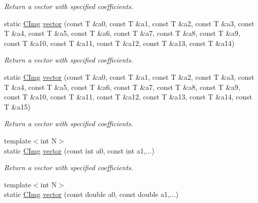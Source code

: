 \begin{DoxyCompactItemize}
\begin{DoxyCompactList}\small\item\em Return a vector with specified coefficients. \end{DoxyCompactList}\item 
\hypertarget{structcimg__library_1_1_c_img_a38eca269e613757819feccae04f5cd29}{static \hyperlink{structcimg__library_1_1_c_img}{C\-Img} \hyperlink{structcimg__library_1_1_c_img_a38eca269e613757819feccae04f5cd29}{vector} (const T \&a0, const T \&a1, const T \&a2, const T \&a3, const T \&a4, const T \&a5, const T \&a6, const T \&a7, const T \&a8, const T \&a9, const T \&a10, const T \&a11, const T \&a12, const T \&a13, const T \&a14)}\label{structcimg__library_1_1_c_img_a38eca269e613757819feccae04f5cd29}

\begin{DoxyCompactList}\small\item\em Return a vector with specified coefficients. \end{DoxyCompactList}\item 
\hypertarget{structcimg__library_1_1_c_img_afcce36993b98a8a1a49cdae3f946b614}{static \hyperlink{structcimg__library_1_1_c_img}{C\-Img} \hyperlink{structcimg__library_1_1_c_img_afcce36993b98a8a1a49cdae3f946b614}{vector} (const T \&a0, const T \&a1, const T \&a2, const T \&a3, const T \&a4, const T \&a5, const T \&a6, const T \&a7, const T \&a8, const T \&a9, const T \&a10, const T \&a11, const T \&a12, const T \&a13, const T \&a14, const T \&a15)}\label{structcimg__library_1_1_c_img_afcce36993b98a8a1a49cdae3f946b614}

\begin{DoxyCompactList}\small\item\em Return a vector with specified coefficients. \end{DoxyCompactList}\item 
\hypertarget{structcimg__library_1_1_c_img_af86ddfa61f0c1717fdda7daf2ecfad61}{{\footnotesize template$<$int N$>$ }\\static \hyperlink{structcimg__library_1_1_c_img}{C\-Img} \hyperlink{structcimg__library_1_1_c_img_af86ddfa61f0c1717fdda7daf2ecfad61}{vector} (const int a0, const int a1,...)}\label{structcimg__library_1_1_c_img_af86ddfa61f0c1717fdda7daf2ecfad61}

\begin{DoxyCompactList}\small\item\em Return a vector with specified coefficients. \end{DoxyCompactList}\item 
\hypertarget{structcimg__library_1_1_c_img_a094ef2d571d499122cb152903339be79}{{\footnotesize template$<$int N$>$ }\\static \hyperlink{structcimg__library_1_1_c_img}{C\-Img} \hyperlink{structcimg__library_1_1_c_img_a094ef2d571d499122cb152903339be79}{vector} (const double a0, const double a1,...)}\label{structcimg__library_1_1_c_img_a094ef2d571d499122cb152903339be79}


\end{DoxyCompactItemize}
